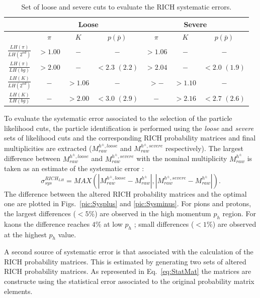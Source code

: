 \begin{table}[!h]
	\centering
	\begin{tabular}{ccccccc}
		\hline
		 & \multicolumn{3}{c}{Loose} & \multicolumn{3}{c}{Severe} \\
		\hline
		 & $\pi$ & $K$ & $p(\bar{p})$ & $\pi$ & $K$ & $p(\bar{p})$ \\
		\hline
		$\frac{LH(\pi)}{LH(2^{nd})}$ & $> 1.00$ & $-$ & $-$ & $>1.06$ & $-$ & $-$ \\
		$\frac{LH(\pi)}{LH(bg)}$ & $> 2.00$ & $-$ & $<2.3$ $(2.2)$ & $>2.04$ & $-$ & $<2.0$ $(1.9)$ \\
		$\frac{LH(K)}{LH(2^{nd})}$ & $-$ & $>1.06$ & $-$ & $>-$ & $>1.10$ & $-$ \\
		$\frac{LH(K)}{LH(bg)}$ & $-$ & $>2.00$ & $<3.0$ $(2.9)$ & $-$ & $>2.16$ & $<2.7$ $(2.6)$ \\
		\hline
	\end{tabular}
  \caption{Set of loose and severe cuts to evaluate the RICH systematic errors.}
  \label{tab:loose.severe}
\end{table}

To evaluate the systematic error associated to the selection of the particle likelihood cuts, the particle identification is performed using the \textit{loose}
and \textit{severe} sets of likelihood cuts and the corresponding RICH probability matrices and final multiplicities are extracted ($M^{h^{\pm},loose}_{raw}$
and $M^{h^{\pm},severe}_{raw}$ respectively). The largest difference between $M^{h^{\pm},loose}_{raw}$ and $M^{h^{\pm},severe}_{raw}$ with the nominal
multiplicity $M^{h^{\pm}}_{raw}$ is taken as an estimate of the systematic error :
%
\begin{equation}
  \sigma^{RICH_{LH}}_{sys} = MAX(|M^{h^{\pm},loose}_{raw}-M^{h^{\pm}}_{raw}|,|M^{h^{\pm},severe}_{raw}-M^{h^{\pm}}_{raw}|).
\end{equation}
%
The difference between the altered RICH probability matrices and the optimal one are plotted in Figs.~\ref{pic:Sysplus} and \ref{pic:Sysminus}. For pions and protons, the largest differences
($<5$\%) are observed in the high momentum $p_h$ region. For kaons the difference reaches $4$\% at low $p_h$ ; small differences ($<1$\%) are observed at the
highest $p_h$ value.

A second source of systematic error is that associated with the calculation of the RICH probability matrices. This is estimated by generating two sets of altered
RICH probability matrices. As represented in Eq.~\ref{eq:StatMat} the matrices are constructe using the statistical error associated to the original probability matrix elements.

